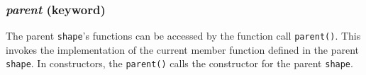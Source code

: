    \subsubsection{\textit{parent} (keyword)}
    The parent \texttt{shape}'s functions can be accessed by the function call \texttt{parent()}. This invokes the implementation of the current member function defined in the parent \texttt{shape}. In constructors, the \texttt{parent()} calls the constructor for the parent \texttt{shape}.

